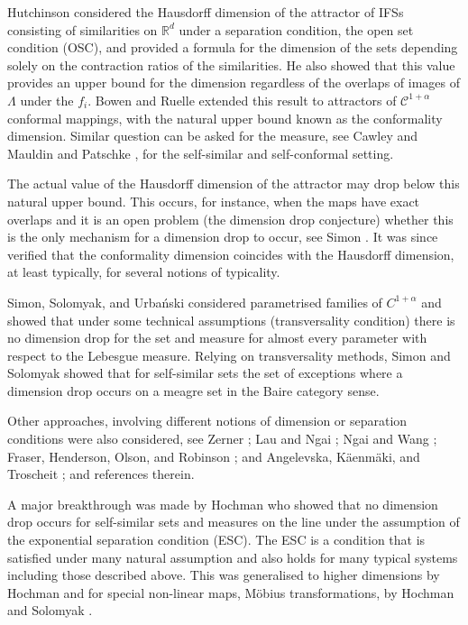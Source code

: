 \documentclass[12pt,]{article}
\theoremstyle{definition}
\theoremstyle{remark}
\newcommand{\0}{\mathbf{0}}
\begin{document}
{Hutchinson \cite{Hutchinson_Attractor_81} considered the Hausdorff dimension of the attractor of
IFSs consisting of similarities on $\mathbb{R}^d$ under a separation condition, the open set
condition (OSC), and provided a formula for the dimension of the sets depending solely on the
contraction ratios of the similarities.  He also showed that this value provides an upper bound for
the dimension regardless of the overlaps of images of $\Lambda$ under the $f_i$.  Bowen
\cite{Bowen75} and Ruelle \cite{Ruelle2004} extended this result to attractors of
$\mathcal{C}^{1+\alpha}$ conformal mappings, with the natural upper bound known as the conformality
dimension. Similar question can be asked for the measure, see Cawley and Mauldin
\cite{CawleyMauldin92} and Patschke \cite{Patzschke97}, for the self-similar and self-conformal
setting. 

The actual value of the Hausdorff dimension of the attractor may drop below this natural upper
bound. This occurs, for instance, when the maps have exact overlaps and it is an open problem (the
dimension drop conjecture) whether this is the only mechanism for a dimension drop to occur, see
Simon \cite{Simon1996}.  It was since verified that the conformality dimension coincides with the
Hausdorff dimension, at least typically, for several notions of typicality.

Simon, Solomyak, and Urba\'nski \cite{SimonSolomyakUrbanski1,SimonSolomyakUrbanski2} considered
parametrised families of $C^{1+\alpha}$ and showed that under some technical assumptions
(transversality condition) there is no dimension drop for the set and measure for almost every
parameter with respect to the Lebesgue measure. Relying on transversality methods, Simon and
Solomyak \cite{SimonSolomyak02} showed that for self-similar sets the set of exceptions where a
dimension drop occurs on a meagre set in the Baire category sense. 

Other approaches, involving different notions of dimension or separation conditions were also
considered, see
Zerner \cite{Zerner1996}; Lau and Ngai \cite{LauNgai1999}; Ngai and Wang \cite{NgaiWang2001}; Fraser,
Henderson, Olson, and Robinson \cite{FHOR2015}; and Angelevska, K\"aenm\"aki, and Troscheit
\cite{AngelevskaKaenmakiTroscheit2020}; and references therein.

A major breakthrough was made by Hochman \cite{Hochman_SelfSimESC_Annals} who showed that no
dimension drop occurs for self-similar sets and measures on the line under the
assumption of the exponential separation condition (ESC).
The ESC is a condition that is satisfied under many natural assumption and also holds for many typical
systems including those described above. 
This was generalised to higher dimensions by Hochman \cite{Hochman2017} and for special non-linear
maps, M\"obius transformations, by Hochman and Solomyak \cite{HochmanSolomyak_Invent17}.


}
\end{document}
